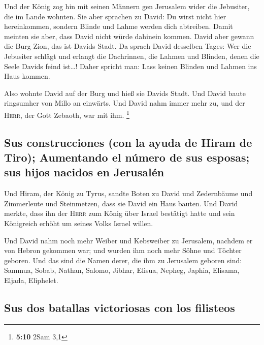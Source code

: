  Und der König zog hin mit seinen Männern gen Jerusalem
wider die Jebusiter, die im Lande wohnten. Sie aber sprachen zu David:
Du wirst nicht hier hereinkommen, sondern Blinde und Lahme werden dich
abtreiben. Damit meinten sie aber, dass David nicht würde dahinein
kommen.  David aber gewann die Burg Zion, das ist Davids
Stadt.  Da sprach David desselben Tages: Wer die Jebusiter
schlägt und erlangt die Dachrinnen, die Lahmen und Blinden, denen die
Seele Davids feind ist\ldots! Daher spricht man: Lass keinen Blinden und
Lahmen ins Haus kommen.

 Also wohnte David auf der Burg und hieß sie Davids Stadt.
Und David baute ringsumher von Millo an einwärts.  Und
David nahm immer mehr zu, und der \textsc{Herr}, der Gott Zebaoth, war
mit ihm. \footnote{\textbf{5:10} 2Sam 3,1}

\hypertarget{sus-construcciones-con-la-ayuda-de-hiram-de-tiro-aumentando-el-nuxfamero-de-sus-esposas-sus-hijos-nacidos-en-jerusaluxe9n}{%
\subsection{Sus construcciones (con la ayuda de Hiram de Tiro);
Aumentando el número de sus esposas; sus hijos nacidos en
Jerusalén}\label{sus-construcciones-con-la-ayuda-de-hiram-de-tiro-aumentando-el-nuxfamero-de-sus-esposas-sus-hijos-nacidos-en-jerusaluxe9n}}

 Und Hiram, der König zu Tyrus, sandte Boten zu David und
Zedernbäume und Zimmerleute und Steinmetzen, dass sie David ein Haus
bauten.  Und David merkte, dass ihn der \textsc{Herr} zum
König über Israel bestätigt hatte und sein Königreich erhöht um seines
Volks Israel willen.

 Und David nahm noch mehr Weiber und Kebsweiber zu
Jerusalem, nachdem er von Hebron gekommen war; und wurden ihm noch mehr
Söhne und Töchter geboren.  Und das sind die Namen derer,
die ihm zu Jerusalem geboren sind: Sammua, Sobab, Nathan, Salomo,
 Jibhar, Elisua, Nepheg, Japhia,  Elisama,
Eljada, Eliphelet.

\hypertarget{sus-dos-batallas-victoriosas-con-los-filisteos}{%
\subsection{Sus dos batallas victoriosas con los
filisteos}\label{sus-dos-batallas-victoriosas-con-los-filisteos}}

